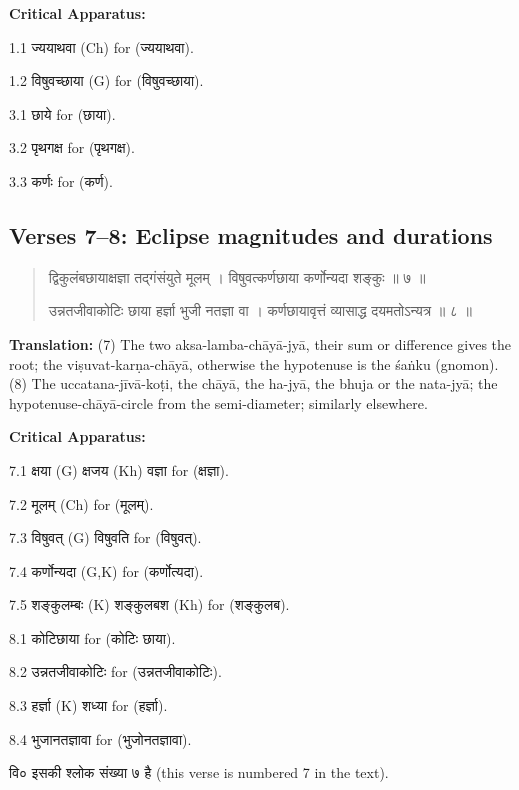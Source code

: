 \documentclass[11pt,a4paper]{article}
\newcommand{\dev}[1]{{\devanagarifont #1}}
\newenvironment{sanskritverse}{%
  \begin{quote}%
  \devanagarifont%
  \setlength{\leftmargin}{2em}%
}{\end{quote}}
\newenvironment{variants}{%
  \small%
  \color{varecolor}%
  \list{}{\leftmargin=2em\itemindent=-1em}%
}{\endlist}
\begin{document}
\textcolor{varecolor}{\textbf{Critical Apparatus:}}
\begin{variants}
\item[1.1] \dev{ज्ययाथवा} (Ch) \dev{for} (\dev{ज्ययाथवा}).
\item[1.2] \dev{विषुवच्छाया} (G) \dev{for} (\dev{विषुवच्छाया}).
\item[3.1] \dev{छाये} \dev{for} (\dev{छाया}).
\item[3.2] \dev{पृथगक्ष} \dev{for} (\dev{पृथगक्ष}).
\item[3.3] \dev{कर्णः} \dev{for} (\dev{कर्ण}).
\end{variants}

\subsection*{Verses 7--8: Eclipse magnitudes and durations}

\begin{sanskritverse}
\dev{द्विकुलंबछायाक्षज्ञा तद्गंसंयुते मूलम्} ।
\dev{विषुवत्कर्णछाया कर्णोन्यदा शङ्कुः ॥ ७ ॥}

\dev{उन्नतजीवाकोटिः छाया हर्ज्ञा भुजी नतज्ञा वा} ।
\dev{कर्णछायावृत्तं व्यासाद्ध दयमतोऽन्यत्र ॥ ८ ॥}
\end{sanskritverse}

\textbf{Translation:} (7) The two aksa-lamba-chāyā-jyā, their sum or difference gives 
the root; the viṣuvat-karṇa-chāyā, otherwise the hypotenuse is the śaṅku (gnomon). 
(8) The uccatana-jīvā-koṭi, the chāyā, the ha-jyā, the bhuja or the nata-jyā; 
the hypotenuse-chāyā-circle from the semi-diameter; similarly elsewhere.

\textcolor{varecolor}{\textbf{Critical Apparatus:}}
\begin{variants}
\item[7.1] \dev{क्षया} (G) \dev{क्षजय} (Kh) \dev{वज्ञा} \dev{for} (\dev{क्षज्ञा}).
\item[7.2] \dev{मूलम्} (Ch) \dev{for} (\dev{मूलम्}).
\item[7.3] \dev{विषुवत्} (G) \dev{विषुवति} \dev{for} (\dev{विषुवत्}).
\item[7.4] \dev{कर्णोन्यदा} (G,K) \dev{for} (\dev{कर्णोत्यदा}).
\item[7.5] \dev{शङ्कुलम्बः} (K) \dev{शङ्कुलबश} (Kh) \dev{for} (\dev{शङ्कुलब}).
\item[8.1] \dev{कोटिछाया} \dev{for} (\dev{कोटिः छाया}).
\item[8.2] \dev{उन्नतजीवाकोटिः} \dev{for} (\dev{उन्नतजीवाकोटिः}).
\item[8.3] \dev{हर्ज्ञा} (K) \dev{शध्या} \dev{for} (\dev{हर्ज्ञा}).
\item[8.4] \dev{भुजानतज्ञावा} \dev{for} (\dev{भुजोनतज्ञावा}).
\item[\dev{वि०}] \dev{इसकी श्लोक संख्या ७ है} (this verse is numbered 7 in the text).
\end{variants}
\end{document}
